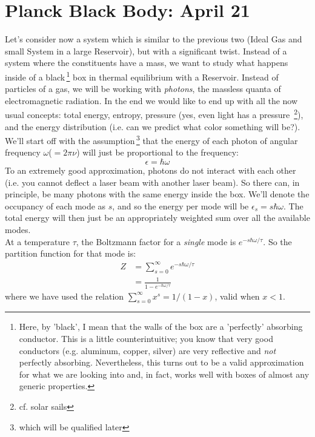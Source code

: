 \section{Planck Black Body: April 21}

Let's consider now a system which is similar to the previous two (Ideal Gas and small System in a large Reservoir), but with a significant twist. Instead of a system where the constituents have a mass, we want to study what happens inside of a 
black\,\footnote{Here, by 'black', I mean that the walls of the box are a 'perfectly' absorbing conductor. This is a little counterintuitive; you know that very good conductors (e.g. aluminum, copper, silver) are very reflective and \emph{not} perfectly absorbing. Nevertheless, this turns out to be a valid approximation for what we are looking into and, in fact, works well with boxes of almost any generic properties.} box in thermal equilibrium with a Reservoir. Instead of particles of a gas, we will be working with \textit{photons}, the massless quanta of electromagnetic radiation. In the end we would like to end up with all the now usual concepts: total energy, entropy, pressure (yes, even light has a 
pressure~\footnote{cf. solar sails}), and the energy distribution (i.e. can 
we predict what color something will be?). \\

We'll start off with the assumption\,\footnote{which will be qualified later} that the energy of each photon of angular frequency $\omega$($=2 \pi \nu$) will just be proportional to the frequency:
\begin{equation}
\epsilon = \hbar \omega
\end{equation}
To an extremely good approximation, photons do not interact with each other (i.e. you cannot deflect a laser beam with another laser beam). So there can, in principle, be many photons with the same energy inside the box. We'll denote the occupancy of each mode as $s$, and so the energy per mode will be $\epsilon_s = s \hbar \omega$. The total energy will then just be an appropriately weighted sum over all the available modes.\\

At a temperature $\tau$, the Boltzmann factor for a \textit{single} mode 
is $e^{-s \hbar \omega / \tau}$. So the partition function for that mode is:
\begin{align}
Z &= \sum_{s=0}^{\infty} e^{-s \hbar \omega / \tau} \\
  &= \frac{1}{1 - e^{-\hbar \omega / \tau}}
\label{eq:PartPlanck}
\end{align}
where we have used the relation $\sum_{s=0}^{\infty} x^s = 1/(1-x)$, 
valid when $x < 1$. \\

